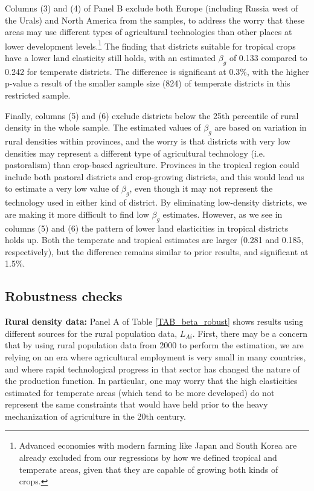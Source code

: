 \documentclass[11pt]{article}
\begin{document}
Columns (3) and (4) of Panel B exclude both Europe (including Russia west of the Urals) and North America from the samples, to address the worry that these areas may use different types of agricultural technologies than other places at lower development levels.\footnote{Advanced economies with modern farming like Japan and South Korea are already excluded from our regressions by how we defined tropical and temperate areas, given that they are capable of growing both kinds of crops.} The finding that districts suitable for tropical crops have a lower land elasticity still holds, with an estimated $\beta_g$ of 0.133 compared to 0.242 for temperate districts. The difference is significant at 0.3\%, with the higher p-value a result of the smaller sample size (824) of temperate districts in this restricted sample.

Finally, columns (5) and (6) exclude districts below the 25th percentile of rural density in the whole sample. The estimated values of $\beta_g$ are based on variation in rural densities within provinces, and the worry is that districts with very low densities may represent a different type of agricultural technology (i.e. pastoralism) than crop-based agriculture. Provinces in the tropical region could include both pastoral districts and crop-growing districts, and this would lead us to estimate a very low value of $\beta_g$, even though it may not represent the technology used in either kind of district. By eliminating low-density districts, we are making it more difficult to find low $\beta_g$ estimates. However, as we see in columns (5) and (6) the pattern of lower land elasticities in tropical districts holds up. Both the temperate and tropical estimates are larger (0.281 and 0.185, respectively), but the difference remains similar to prior results, and significant at 1.5\%.

\subsection{Robustness checks}
\noindent\textbf{Rural density data:} Panel A of Table \ref{TAB_beta_robust} shows results using different sources for the rural population data, $L_{Ai}$. First, there may be a concern that by using rural population data from 2000 to perform the estimation, we are relying on an era where agricultural employment is very small in many countries, and where rapid technological progress in that sector has changed the nature of the production function. In particular, one may worry that the high elasticities estimated for temperate areas (which tend to be more developed) do not represent the same constraints that would have held prior to the heavy mechanization of agriculture in the 20th century.
\end{document}
